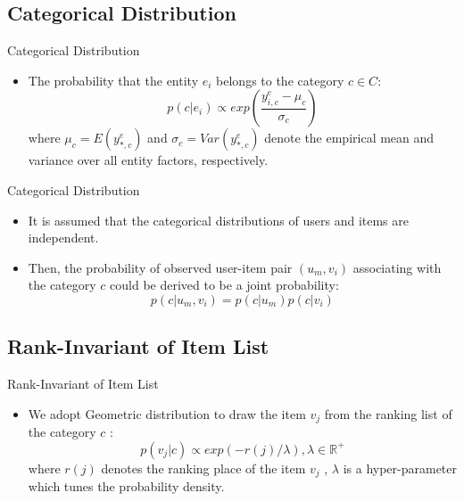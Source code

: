 \subsection*{Categorical Distribution}
\begin{frame}{Categorical Distribution}
	\begin{itemize}
		\item  The probability that the entity $e_i$ belongs to the category $c \in C$:
		\begin{equation}
		p\left(c|e_i\right)  \propto exp\left( \frac {y_{i,c}^e - \mu_c}{\sigma_c} \right)
		\end{equation}
		where $\mu _c = E\left(y^e_{*,c}\right)$ and $\sigma_c = Var\left(y^e_{*,c}\right)$ denote the empirical mean and variance over all entity factors, respectively.
		
	\end{itemize}
\end{frame}
\begin{frame}{Categorical Distribution}
	\begin{itemize}
		\setlength{\itemsep}{1.5em}
		\item It is assumed that the categorical distributions of users and items
		are independent.
		\item Then, the probability of observed
		user-item pair $(u_m ,v_i )$ associating with the category $c$ could be derived to be a
		joint probability:
		\begin{equation}
		\label{equ:uipair}
		p\left(c|u_m,v_i\right) = p\left(c|u_m\right)p\left(c|v_i\right)
		\end{equation}
	\end{itemize}
\end{frame}





\subsection*{Rank-Invariant of Item List}
\begin{frame}{Rank-Invariant of Item List}
	\begin{itemize}
		
		\item We adopt Geometric distribution to draw the item
		$v_j$ from the ranking list of the category $c$ :
		\begin{equation}
		p\left(v_j|c\right) \propto exp\left(-r\left(j\right)/\lambda\right),\lambda \in \mathbb{R}^+
		\end{equation}
		where $r(j)$ denotes the ranking place of the item $v_j$ , $\lambda$ is
		a hyper-parameter which tunes the probability density.
	\end{itemize}
	
\end{frame}






